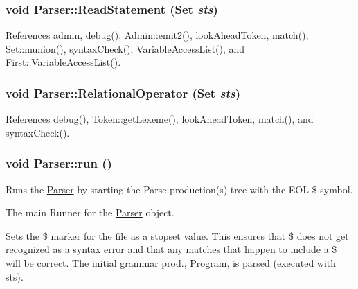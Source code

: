 \hypertarget{classParser_ac356b40bf99f68cc721b7e4ad2ebb67d}{
\subsubsection[{ReadStatement}]{\setlength{\rightskip}{0pt plus 5cm}void Parser::ReadStatement ({\bf Set} {\em sts})}}
\label{classParser_ac356b40bf99f68cc721b7e4ad2ebb67d}


References admin, debug(), Admin::emit2(), lookAheadToken, match(), Set::munion(), syntaxCheck(), VariableAccessList(), and First::VariableAccessList().

\hypertarget{classParser_ab68b61bab0a323b67457d520578cb853}{
\subsubsection[{RelationalOperator}]{\setlength{\rightskip}{0pt plus 5cm}void Parser::RelationalOperator ({\bf Set} {\em sts})}}
\label{classParser_ab68b61bab0a323b67457d520578cb853}


References debug(), Token::getLexeme(), lookAheadToken, match(), and syntaxCheck().

\hypertarget{classParser_a9e8d06d145f534e73a40b38e3f6711a0}{
\subsubsection[{run}]{\setlength{\rightskip}{0pt plus 5cm}void Parser::run ()}}
\label{classParser_a9e8d06d145f534e73a40b38e3f6711a0}


Runs the \hyperlink{classParser}{Parser} by starting the Parse production(s) tree with the EOL \$ symbol. 

The main Runner for the \hyperlink{classParser}{Parser} object.

Sets the \$ marker for the file as a stopset value. This ensures that \$ does not get recognized as a syntax error and that any matches that happen to include a \$ will be correct. The initial grammar prod., Program, is parsed (executed with sts). 

